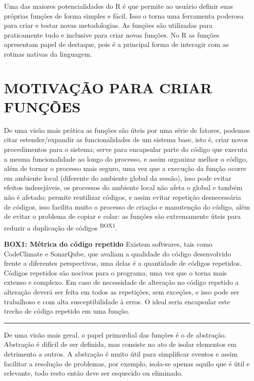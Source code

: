 \documentclass[
  11pt,
  a5paper,
  openany]{book}
\begin{document}
Uma das maiores potencialidades do R é que permite ao usuário definir suas próprias funções de forma simples e fácil. Isso o torna uma ferramenta poderosa para criar e testar novas metodologias. As funções são utilizadas para praticamente tudo e inclusive para criar novas funções. No R as funções apresentam papel de destaque, pois é a principal forma de interagir com as rotinas nativas da linguagem.

\hypertarget{motivauxe7uxe3o-para-criar-funuxe7uxf5es}{%
\section{MOTIVAÇÃO PARA CRIAR FUNÇÕES}\label{motivauxe7uxe3o-para-criar-funuxe7uxf5es}}

De uma visão mais prática as funções são úteis por uma série de fatores, podemos citar estender/expandir as funcionalidades de um sistema base, isto é, criar novos procedimentos para o sistema; serve para encapsular parte do código que executa a mesma funcionalidade ao longo do processo, e assim organizar melhor o código, além de tornar o processo mais seguro, uma vez que a execução da função ocorre em ambiente local (diferente do ambiente global da sessão), isso pode evitar efeitos indesejáveis, os processos do ambiente local não afeta o global e também não é afetado; permite reutilizar códigos, e assim evitar repetição desnecessária de códigos, isso facilita muito o processo de criação e manutenção do código, além de evitar o problema de copiar e colar: as funções são extremamente úteis para reduzir a duplicação de códigos \textsuperscript{BOX1}.

\textbf{BOX1: Métrica do código repetido}
Existem softwares, tais como CodeClimate e SonarQube, que avaliam a qualidade do código desenvolvido frente a diferentes perspectivas, uma delas é a quantidade de códigos repetidos. Códigos repetidos são nocivos para o programa, uma vez que o torna mais extenso e complexo. Em caso de necessidade de alteração no código repetido a alteração deverá ser feita em todos as repetições, sem exceções, e isso pode ser trabalhoso e com alta susceptibilidade à erros. O ideal seria encapsular este trecho de código repetido em uma função.

\begin{center}\rule{0.5\linewidth}{0.5pt}\end{center}

De uma visão mais geral, o papel primordial das funções é o de abstração. Abstração é difícil de ser definida, mas consiste no ato de isolar elementos em detrimento a outros. A abstração é muito útil para simplificar eventos e assim facilitar a resolução de problemas, por exemplo, isola-se apenas aquilo que é útil e relevante, todo resto então deve ser esquecido ou eliminado.
\end{document}
